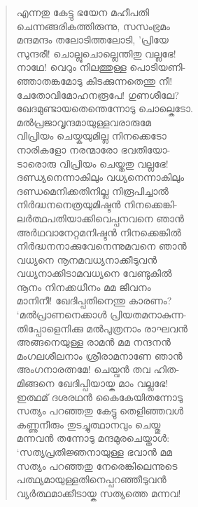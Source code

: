 \begin{verse}
എന്നതു കേട്ടു ഭയേന മഹീപതി\\
ചെന്നങ്ങരികത്തിരുന്നു, സസംഭ്രമം\\
മന്ദമന്ദം തലോടിത്തലോടി, ’പ്രിയേ\\
സുന്ദരീ! ചൊല്ലുചൊല്ലെന്തിതു വല്ലഭേ!\\
നാഥേ! വെറും നിലത്തുള്ള പൊടിയണി-\\
ഞ്ഞാതങ്കമോടു കിടക്കുന്നതെന്തു നീ!\\
ചേതോവിമോഹനരൂപേ! ഗുണശീലേ?\\
ഖേദമുണ്ടായതെന്തെന്നോടു ചൊല്കെടോ.\\
മല്‍പ്രജാവൃന്ദമായുള്ളവരാരുമേ\\
വിപ്രിയം ചെയ്കയുമില്ല നിനക്കെടോ\\
നാരികളോ നരന്മാരോ ഭവതിയോ-\\
ടാരൊരു വിപ്രിയം ചെയ്തതു വല്ലഭേ!\\
ദണ്ഡ്യനെന്നാകിലും വധ്യനെന്നാകിലും\\
ദണ്ഡമെനിക്കതിനില്ല നിരൂപിച്ചാല്‍\\
നിര്‍ദ്ധനനെത്രയുമിഷ്ടന്‍ നിനക്കെങ്കി-\\
ലര്‍ത്ഥപതിയാക്കിവെപ്പനവനെ ഞാന്‍\\
അര്‍ഥവാനേറ്റമനിഷ്ടന്‍ നിനക്കെങ്കില്‍\\
നിര്‍ദ്ധനനാക്കുവേനെന്നുമവനെ ഞാന്‍\\
വധ്യനെ നൂനമവധ്യനാക്കീടുവന്‍\\
വധ്യനാക്കിടാമവധ്യനെ വേണ്ടുകില്‍\\
നൂനം നിനക്കധീനം മമ ജീവനം\\
മാനിനീ! ഖേദിപ്പതിനെന്തു കാരണം?\\
‘മല്‍പ്രാണനെക്കാള്‍ പ്രിയതമനാകുന്ന-\\
തിപ്പോളെനിക്കു മല്‍പുത്രനാം രാഘവന്‍\\
അങ്ങനെയുള്ള രാമന്‍ മമ നന്ദനന്‍\\
മംഗലശീലനാം ശ്രീരാമനാണേ ഞാന്‍\\
അംഗനാരത്നമേ! ചെയ്വന്‍ തവ ഹിത-\\
മിങ്ങനെ ഖേദിപ്പിയായ്ക മാം വല്ലഭേ!\\
ഇത്ഥമ് ദശരഥന്‍ കൈകേയിതന്നോടു\\
സത്യം പറഞ്ഞതു കേട്ടു തെളിഞ്ഞവള്‍\\
കണ്ണുനീരും തുടച്ചുത്ഥാനവും ചെയ്തു\\
മന്നവന്‍ തന്നോടു മന്ദമുരചെയ്താള്‍:\\
‘സത്യപ്രതിജ്ഞനായുള്ള ഭവാന്‍ മമ\\
സത്യം പറഞ്ഞതു നേരെങ്കിലെന്നുടെ\\
പത്ഥ്യമായുള്ളതിനെപ്പറഞ്ഞീടുവന്‍\\
വ്യര്‍ത്ഥമാക്കീടായ്ക സത്യത്തെ മന്നവ!\\

\end{verse}
